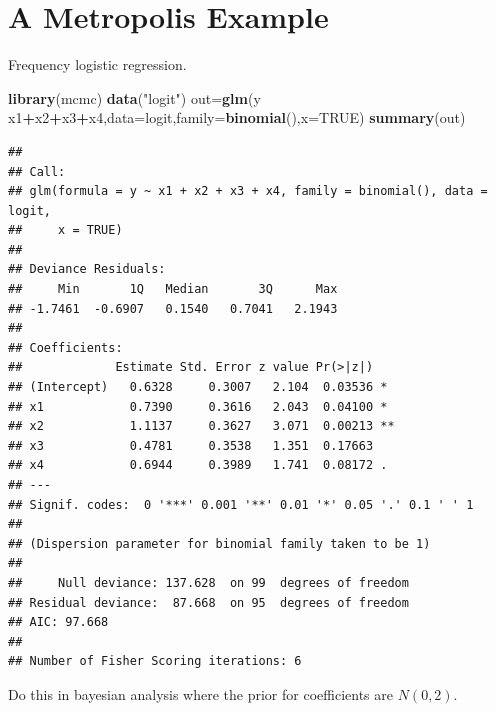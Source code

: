 \documentclass[
]{book}
\newenvironment{Shaded}{\begin{snugshade}}{\end{snugshade}}
\newcommand{\DataTypeTok}[1]{\textcolor[rgb]{0.13,0.29,0.53}{#1}}
\newcommand{\KeywordTok}[1]{\textcolor[rgb]{0.13,0.29,0.53}{\textbf{#1}}}
\newcommand{\NormalTok}[1]{#1}
\newcommand{\OperatorTok}[1]{\textcolor[rgb]{0.81,0.36,0.00}{\textbf{#1}}}
\newcommand{\OtherTok}[1]{\textcolor[rgb]{0.56,0.35,0.01}{#1}}
\newcommand{\StringTok}[1]{\textcolor[rgb]{0.31,0.60,0.02}{#1}}
\theoremstyle{definition}
\theoremstyle{definition}
\theoremstyle{definition}
\theoremstyle{remark}
\begin{document}
\hypertarget{a-metropolis-example}{%
\section{A Metropolis Example}\label{a-metropolis-example}}

Frequency logistic regression.

\begin{Shaded}
\begin{Highlighting}[]
\KeywordTok{library}\NormalTok{(mcmc)}
\KeywordTok{data}\NormalTok{(}\StringTok{"logit"}\NormalTok{)}
\NormalTok{out=}\KeywordTok{glm}\NormalTok{(y}\OperatorTok{~}\StringTok{ }\NormalTok{x1}\OperatorTok{+}\NormalTok{x2}\OperatorTok{+}\NormalTok{x3}\OperatorTok{+}\NormalTok{x4,}\DataTypeTok{data=}\NormalTok{logit,}\DataTypeTok{family=}\KeywordTok{binomial}\NormalTok{(),}\DataTypeTok{x=}\OtherTok{TRUE}\NormalTok{)}
\KeywordTok{summary}\NormalTok{(out)}
\end{Highlighting}
\end{Shaded}

\begin{verbatim}
## 
## Call:
## glm(formula = y ~ x1 + x2 + x3 + x4, family = binomial(), data = logit, 
##     x = TRUE)
## 
## Deviance Residuals: 
##     Min       1Q   Median       3Q      Max  
## -1.7461  -0.6907   0.1540   0.7041   2.1943  
## 
## Coefficients:
##             Estimate Std. Error z value Pr(>|z|)   
## (Intercept)   0.6328     0.3007   2.104  0.03536 * 
## x1            0.7390     0.3616   2.043  0.04100 * 
## x2            1.1137     0.3627   3.071  0.00213 **
## x3            0.4781     0.3538   1.351  0.17663   
## x4            0.6944     0.3989   1.741  0.08172 . 
## ---
## Signif. codes:  0 '***' 0.001 '**' 0.01 '*' 0.05 '.' 0.1 ' ' 1
## 
## (Dispersion parameter for binomial family taken to be 1)
## 
##     Null deviance: 137.628  on 99  degrees of freedom
## Residual deviance:  87.668  on 95  degrees of freedom
## AIC: 97.668
## 
## Number of Fisher Scoring iterations: 6
\end{verbatim}

Do this in bayesian analysis where the prior for coefficients are \(N(0,2)\).
\end{document}
